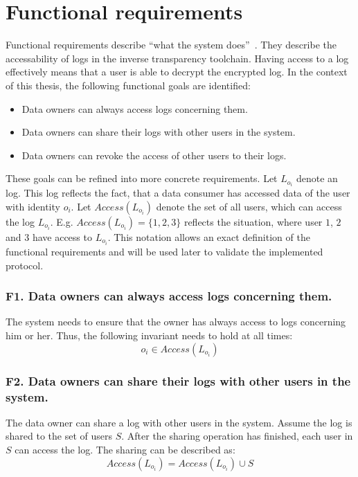 \documentclass[../main.tex]{subfiles}
\begin{document}
\section{Functional requirements}\label{functional-requriements}
Functional requirements describe \enquote{what the system does}~\cite[11]{Mylopoulos1992}.
They describe the accessability of logs in the inverse transparency toolchain.
Having access to a log effectively means that a user is able to decrypt the encrypted log.
In the context of this thesis, the following functional goals are identified:
\begin{itemize}
    \item Data owners can always access logs concerning them.
    \item Data owners can share their logs with other users in the system.
    \item Data owners can revoke the access of other users to their logs.
\end{itemize}

These goals can be refined into more concrete requirements. 
Let $L_{o_i}$ denote an log. 
This log reflects the fact, that a data consumer has accessed data of the user with identity $o_i$.
Let $Access(L_{o_i})$ denote the set of all users, which can access the log $L_{o_i}$.
E.g. $Access(L_{o_i}) =\{1,2,3\}$ reflects the situation, where user $1$, $2$ and $3$ have access to $L_{o_i}$.
This notation allows an exact definition of the functional requirements and will be used later to validate the implemented protocol.


\subsubsection{F1. Data owners can always access logs concerning them.}
The system needs to ensure that the owner has always access to logs concerning him or her. 
Thus, the following invariant needs to hold at all times:
\begin{displaymath}
    o_i \in Access(L_{o_i})
\end{displaymath}


\subsubsection{F2. Data owners can share their logs with other users in the system.}
The data owner can share a log with other users in the system. 
Assume the log is shared to the set of users $S$.
After the sharing operation has finished, each user in $S$ can access the log.
The sharing can be described as: 
\begin{displaymath}
    Access(L_{o_i}) = Access(L_{o_i}) \cup S
\end{displaymath}
\end{document}
